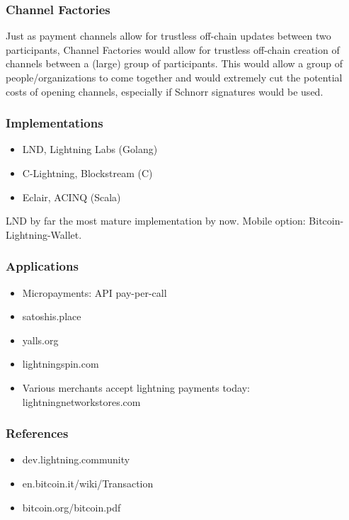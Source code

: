 \documentclass{beamer}
\begin{document}
\begin{frame}
\frametitle{Channel Factories}
Just as payment channels allow for trustless off-chain updates between two participants, Channel Factories would allow for trustless off-chain creation of channels between a (large) group of participants. This would allow a group of people/organizations to come together and would extremely cut the potential costs of opening channels, especially if Schnorr signatures would be used.
\end{frame}
\begin{frame}
\frametitle{Implementations}
\begin{itemize}
\item LND, Lightning Labs (Golang)
\item C-Lightning, Blockstream (C)
\item Eclair, ACINQ (Scala)
\end{itemize}
LND by far the most mature implementation by now. 
Mobile option: Bitcoin-Lightning-Wallet.
\end{frame}
\begin{frame}
\frametitle{Applications}
\begin{itemize}
\item Micropayments: API pay-per-call
\item satoshis.place
\item yalls.org
\item lightningspin.com
\item Various merchants accept lightning payments today:
lightningnetworkstores.com
\end{itemize}
\end{frame}
\begin{frame}
\frametitle{References}

\begin{itemize}
\item dev.lightning.community 
\item en.bitcoin.it/wiki/Transaction
\item bitcoin.org/bitcoin.pdf
\end{itemize} %


\end{frame}


\end{document}
